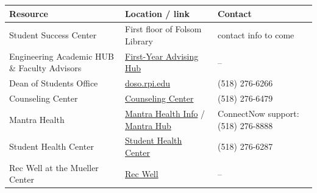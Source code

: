 \begin{tabularx}{\textwidth}{@{}L{0.28\textwidth}L{0.38\textwidth}X@{}}
\toprule
Resource & Location / link & Contact \\
\midrule
Student Success Center & First floor of Folsom Library & contact info to come \\
Engineering Academic HUB \& Faculty Advisors & \href{https://eng.rpi.edu/students/advising/first-year-advising-hub}{First-Year Advising Hub} & -- \\
Dean of Students Office & \href{https://doso.rpi.edu/}{doso.rpi.edu} & (518) 276-6266 \\
Counseling Center & \href{https://studenthealth.rpi.edu/list-services/counseling-center}{Counseling Center} & (518) 276-6479 \\
Mantra Health & \href{https://studenthealth.rpi.edu/list-services/mental-health-counseling-services/mantra-health}{Mantra Health Info} / \href{https://hub.mantrahealth.com/}{Mantra Hub} & ConnectNow support: (518) 276-8888 \\
Student Health Center & \href{https://studenthealth.rpi.edu/list-services/student-health-center}{Student Health Center} & (518) 276-6287 \\
Rec Well at the Mueller Center & \href{https://recwell.rpi.edu/}{Rec Well} & -- \\
\bottomrule
\end{tabularx}
